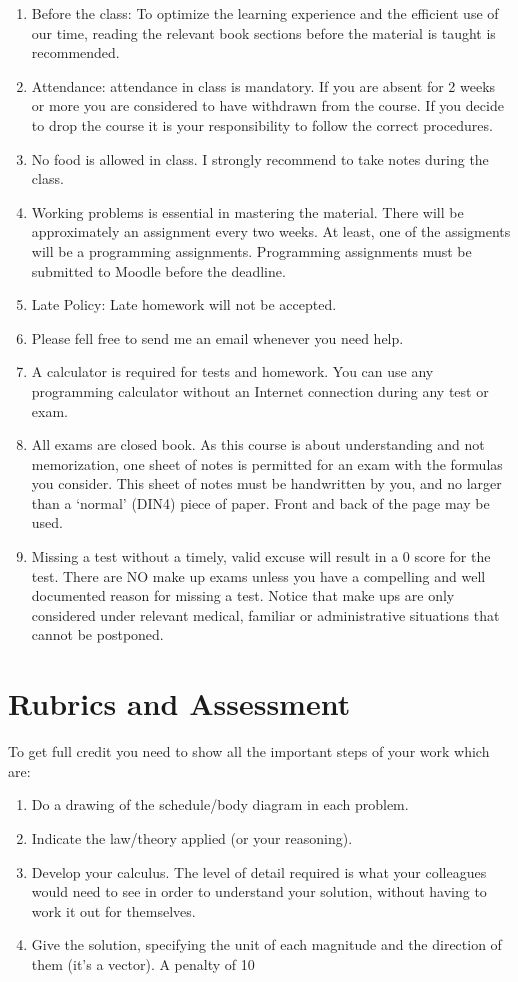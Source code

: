 \documentclass[12pt]{article}
\begin{document}
\begin{enumerate}
\item Before the class: To optimize the learning experience and the efficient use of our time, reading the relevant book sections before the material is taught
 is recommended. 
\item Attendance:  attendance in class is mandatory. If you are absent for 2 weeks or more you are considered to have withdrawn from the course. If you decide to
 drop the course it is your responsibility to follow the correct procedures.
\item No food is allowed in class. I strongly recommend to take notes during the class.
\item Working problems is essential in mastering the material. There will be approximately an assignment every two weeks.  At least, one of the assigments will be a 
programming assignments. Programming assignments must be submitted to Moodle before the deadline.
\item Late Policy: Late homework will not be accepted.
\item  Please fell free to send me an email whenever you need help.
\item A calculator is required for tests and homework. You can use any programming calculator without an Internet connection during any test or exam.
\item All exams are closed book. As this course is about understanding and not memorization, one sheet of notes is permitted for an exam with the formulas you 
consider. This sheet of notes must be handwritten by you, and no larger than a ‘normal’ (DIN4) piece of paper. Front and back of the page may be used.
\item Missing a test without a timely, valid excuse will result in a 0 score for the test. There are NO make up exams unless you have a compelling and well 
documented reason for missing a test. Notice that make ups are only considered under relevant medical, familiar or administrative situations that cannot be 
postponed.
\end{enumerate}

\section*{Rubrics and Assessment}

To get full credit you need to show all the important steps of your work which are:

\begin{enumerate}
\item Do a drawing of the schedule/body diagram in each problem.
\item Indicate the law/theory applied (or your reasoning).
\item Develop your calculus. The level of detail required is what your colleagues would need to see in order to understand your solution, without having to 
work it out for themselves.
\item Give the solution, specifying the unit of each magnitude and the direction of them (it's a vector). A penalty of 10%
\end{enumerate}
\end{document}
